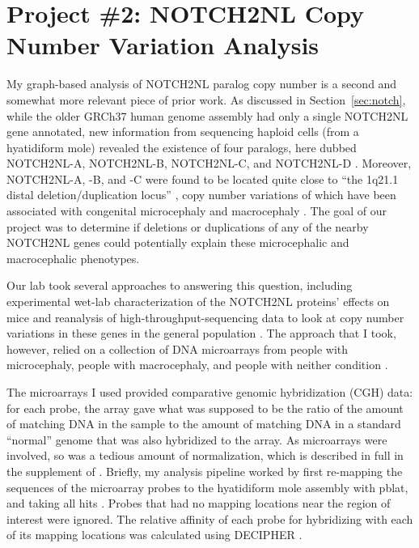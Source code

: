 \documentclass[11pt,proposal]{ucthesis}
\begin{document}
    

\section{Project \#2: NOTCH2NL Copy Number Variation Analysis}

My graph-based analysis of NOTCH2NL paralog copy number is a second and somewhat more relevant piece of prior work. As discussed in Section~\ref{sec:notch}, while the older GRCh37 human genome assembly had only a single NOTCH2NL gene annotated, new information from sequencing haploid cells (from a hyatidiform mole) revealed the existence of four paralogs, here dubbed NOTCH2NL-A, NOTCH2NL-B, NOTCH2NL-C, and NOTCH2NL-D \cite{jacobs2014recently}. Moreover, NOTCH2NL-A, -B, and -C were found to be located quite close to ``the 1q21.1 distal deletion/duplication locus'' \cite{jacobs2014recently}, copy number variations of which have been associated with congenital microcephaly and macrocephaly \cite{jacobs2014recently}. The goal of our project was to determine if deletions or duplications of any of the nearby NOTCH2NL genes could potentially explain these microcephalic and macrocephalic phenotypes.

Our lab took several approaches to answering this question, including experimental wet-lab characterization of the NOTCH2NL proteins' effects on mice and reanalysis of high-throughput-sequencing data to look at copy number variations in these genes in the general population \cite{jacobs2014recently}. The approach that I took, however, relied on a collection of DNA microarrays from people with microcephaly, people with macrocephaly, and people with neither condition \cite{jacobs2014recently}.

The microarrays I used provided comparative genomic hybridization (CGH) data: for each probe, the array gave what was supposed to be the ratio of the amount of matching DNA in the sample to the amount of matching DNA in a standard ``normal'' genome that was also hybridized to the array. As microarrays were involved, so was a tedious amount of normalization, which is described in full in the supplement of \cite{jacobs2014recently}. Briefly, my analysis pipeline worked by first re-mapping the sequences of the microarray probes to the hyatidiform mole assembly with pblat, and taking all hits \cite{meng2012parallelized}. Probes that had no mapping locations near the region of interest were ignored. The relative affinity of each probe for hybridizing with each of its mapping locations was calculated using DECIPHER \cite{wright2012decipher}.
\end{document}
